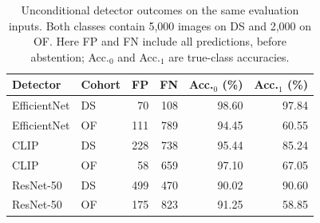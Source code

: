 \begin{table}[t]
\caption{Unconditional detector outcomes on the same evaluation inputs. Both classes contain 5,000 images on DS and 2,000 on OF. Here FP and FN include all predictions, before abstention; Acc.$_0$ and Acc.$_1$ are true-class accuracies.}
\label{tab:class_unconditional}
\centering\small
\begin{tabular}{llrrrr}
\toprule
Detector & Cohort & FP & FN & Acc.$_0$ (\%) & Acc.$_1$ (\%) \\
\midrule
EfficientNet & DS & 70 & 108 & 98.60 & 97.84 \\
EfficientNet & OF & 111 & 789 & 94.45 & 60.55 \\
CLIP & DS & 228 & 738 & 95.44 & 85.24 \\
CLIP & OF & 58 & 659 & 97.10 & 67.05 \\
ResNet-50 & DS & 499 & 470 & 90.02 & 90.60 \\
ResNet-50 & OF & 175 & 823 & 91.25 & 58.85 \\
\bottomrule
\end{tabular}
\end{table}

